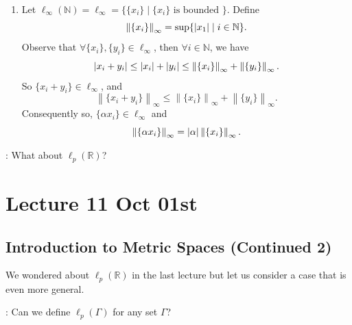 \documentclass[notoc,notitlepage]{tufte-book}
\newcommand{\norm}[1]{\left\| #1 \right\|}
\begin{document}
\begin{eg}
\begin{enumerate}
    \item Let $\ell_\infty(\mathbb{N}) = \ell_\infty = \{ \{ x_i \} \mid \{ x_i \} \text{ is bounded } \}$. Define
      \begin{equation*}
        \norm{ \{ x_i \} }_\infty = \sup \{ \abs{ x_1 } \mid i \in \mathbb{N} \}.
      \end{equation*}
      Observe that $\forall \{ x_i \}, \{ y_i \} \in \ell_\infty$, then $\forall i \in \mathbb{N}$, we have
      \begin{equation*}
        \abs{x_i + y_i} \leq \abs{ x_i } + \abs{ y_i } \leq \norm{\{x_i\}}_\infty + \norm{\{y_i\}}_\infty.
      \end{equation*}
      So $\{ x_i + y_i \} \in \ell_\infty$, and
      \begin{equation*}
        \norm{ \{ x_i + y_i \} }_\infty \leq \norm{ \{ x_i\} }_\infty + \norm{ \{ y_i \} }_\infty.
      \end{equation*}
      Consequently so, $\{ \alpha x_i \} \in \ell_\infty$ and
      \begin{equation*}
        \norm{ \{ \alpha x_i \} }_\infty = \abs{ \alpha } \norm{ \{ x_i \} }_\infty.
      \end{equation*}
  \end{enumerate}
\end{eg}

: What about $\ell_p(\mathbb{R})$?



\chapter{Lecture 11 Oct 01st}%
\label{chp:lecture_11_oct_01st}

\section{Introduction to Metric Spaces (Continued 2)}%
\label{sec:introduction_to_metric_spaces_continued_2}

We wondered about $\ell_p(\mathbb{R})$ in the last lecture but let us consider a case that is even more general.

: Can we define $\ell_p(\Gamma)$ for any set $\Gamma$?
\end{document}
